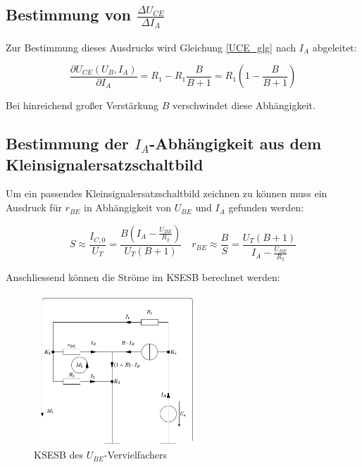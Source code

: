 \subsection{Bestimmung von $\frac{\Delta U_{CE}}{\Delta I_A}$}

Zur Bestimmung dieses Ausdrucks wird Gleichung \ref{UCE_glg} nach $I_A$ abgeleitet:

\begin{equation}
    \frac{\partial U_{CE}\left( U_B, I_A \right)}{\partial I_A} = 
    R_1 - R_1 \frac{B}{B+1} = R_1 \left( 1 - \frac{B}{B+1} \right) \label{dIA_simple}
\end{equation}

Bei hinreichend großer Verstärkung $B$ verschwindet diese Abhängigkeit.

\subsection{Bestimmung der $I_A$-Abhängigkeit aus dem Kleinsignalersatzschaltbild}

Um ein passendes Kleinsignalersatzschaltbild zeichnen zu können muss ein Ausdruck für $r_{BE}$ in Abhängigkeit von $U_{BE}$ und $I_{A}$ gefunden werden:

\begin{equation*}
    S \approx \frac{I_{C,0}}{U_T} = \frac{B \left(I_A - \frac{U_{BE}}{R_2}\right)}{U_T (B+1)}
    \quad 
    r_{BE} \approx \frac{B}{S} = \frac{U_T (B+1)}{I_A - \frac{U_{BE}}{R_2}}
\end{equation*}

Anschliessend können die Ströme im KSESB berechnet werden:

\begin{figure}[H]
    \centering
    \includegraphics[width = 0.55\textwidth]{tex/6_UBE-Vervielfacher/pictures/KSESB.pdf}
    \caption{KSESB des $U_{BE}$-Vervielfachers}
\end{figure}

